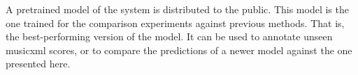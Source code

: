 
A pretrained model of the system is distributed to the
public. This model is the one trained for the comparison
experiments against previous methods. That is, the
best-performing version of the model. It can be used to
annotate unseen \gls{musicxml} scores, or to compare the
predictions of a newer model against the one presented here.
